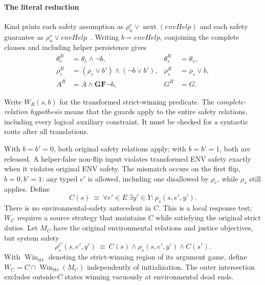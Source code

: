\begin{samepage}
\paragraph{The literal reduction}
Kind prints each safety assumption as
$\rho_n^e\lor\operatorname{next}(\mathit{envHelp})$ and each safety
guarantee as $\rho_n^s\lor\mathit{envHelp}$~\cite[Sec.~4.1]{kind}.
Writing $b=\mathit{envHelp}$, conjoining the complete clauses and
including helper persistence gives
\begin{align}
 \theta_e^R &= \theta_e\land\neg b,
 &\theta_s^R &= \theta_s, \nonumber\\
 \rho_e^R &= (\rho_e\lor b')\land(\neg b\lor b'),
 &\rho_s^R &= \rho_s\lor b, \label{hpb:literal}\\
 A^R &= A\land\mathbf{G}\mathbf{F}\neg b,
 &G^R &= G. \nonumber
\end{align}
\end{samepage}
Write $W_R(s,b)$ for the transformed strict-winning predicate.
The \emph{complete-relation hypothesis} means that the guards apply to
the entire safety relations, including every logical auxiliary constraint.
It must be checked for a syntactic route after all translations.

With $b=b'=0$, both original safety relations apply; with $b=b'=1$,
both are released. A helper-false non-flip input violates transformed
ENV safety exactly when it violates original ENV safety.
The mismatch occurs on the first flip, $b=0,b'=1$:
any typed $e'$ is allowed, including one disallowed by $\rho_e$,
while $\rho_s$ still applies. Define
\begin{equation}
 C(s)\ \equiv\ \forall e'\in E\ \exists y'\in Y:
                    \rho_s(s,e',y').
 \label{hpb:C}
\end{equation}
There is no environmental-safety antecedent in $C$. This is a local
response test; $W_C$ requires a source strategy that maintains $C$ while
satisfying the original strict duties.
Let $M_C$ have the original environmental relations and justice
objectives, but system safety
\begin{equation}
 \rho_s^C(s,e',y')\ \equiv\
 C(s)\land\rho_s(s,e',y')\land C(s').
 \label{hpb:C-invariant}
\end{equation}
With $\operatorname{Win}_{\mathrm{str}}$ denoting the strict-winning
region of its argument game, define
$W_C=C\cap\operatorname{Win}_{\mathrm{str}}(M_C)$ independently
of initialization. The outer intersection excludes outside-$C$
states winning vacuously at environmental dead ends.

